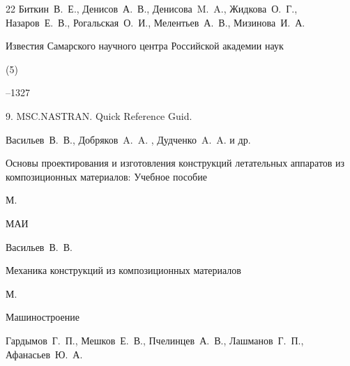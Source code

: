 \begin{thebibliography}{22}
\by Биткин~В.~Е., Денисов~А.~В., Денисова~M.~A., Жидкова~О.~Г., Назаров~Е.~В., Рогальская~О.~И., Мелентьев~А.~В., Мизинова~И.~А.

\jour Известия Самарского научного центра Российской академии наук



(5)

--1327



9. MSC.NASTRAN. Quick Reference Guid.





\by Васильев~В.~В., Добряков~A.~A. , Дудченко~A.~A.  и др.

\book Основы проектирования и изготовления конструкций летательных аппаратов из композиционных материалов: Учебное пособие

\publaddr М.

\publ МАИ







\by Васильев~В.~В.

\book Механика конструкций из композиционных материалов

\publaddr М.

\publ Машиностроение







\by Гардымов~Г.~П., Мешков~Е.~В., Пчелинцев~А.~В., Лашманов~Г.~П., Афанасьев~Ю.~А.


\end{thebibliography}
